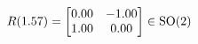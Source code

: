 \documentclass[preview]{standalone}
\begin{document}
\begin{align*}
\special{dvisvgm:raw <g id='unique000'>}R(1.57) = \begin{bmatrix} 0.00 & -1.00 \\ 1.00 & 0.00 \end{bmatrix} \in \text{SO}(2)\special{dvisvgm:raw </g>}
\end{align*}
\end{document}
